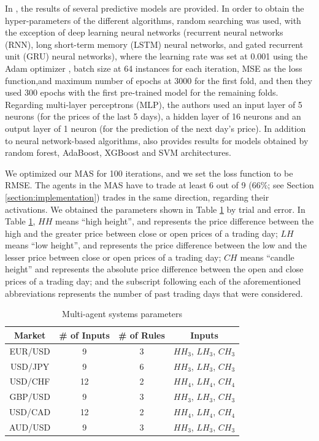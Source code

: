 \documentclass{ieeeaccess}
\begin{document}
In \cite{Munkhdalai2019}, the results of several predictive models are
provided. In order to obtain the hyper-parameters of the different
algorithms, random searching was used, with the exception of deep
learning neural networks (recurrent neural networks (RNN), long
short-term memory (LSTM) neural networks, and gated recurrent unit
(GRU) neural networks), where the learning rate was set at 0.001 using
the Adam optimizer \cite{kingma2014adam}, batch size at 64 instances
for each iteration, MSE as the loss function,and maximum number of
epochs at 3000 for the first fold, and then they used 300 epochs with
the first pre-trained model for the remaining folds. Regarding
multi-layer perceptrons (MLP), the authors used an input layer of 5 neurons
(for the prices of the last 5 days), a hidden layer of 16 neurons and
an output layer of 1 neuron (for the prediction of the next day's
price). In addition to neural network-based algorithms,
\cite{kingma2014adam} also provides results for models obtained by
random forest, AdaBoost, XGBoost and SVM
architectures.

We optimized our MAS for 100 iterations, and we set the loss
function to be RMSE. The agents in the MAS
have to trade at least 6 out of 9 (66\%; see Section
\ref{section:implementation}) trades in the same direction, regarding
their activations. We obtained the parameters shown in Table
\ref{agents-parameters} by trial and error. In Table
\ref{agents-parameters}, $HH$ means ``high height'', and represents
the price difference between the high and the greater price between
close or open prices of a trading day; $LH$ means ``low height'', and
represents the price difference between the low and the lesser price
between close or open prices of a trading day; $CH$ means ``candle
height'' and represents the absolute price difference between the open
and close prices of a trading day; and the subscript following each of
the aforementioned abbreviations represents the number of past trading
days that were considered.


\begin{table}[]
  \caption{Multi-agent systems parameters}
  \small
  \centering
  \begin{tabular}{cccc}
    \textbf{Market} & \textbf{\# of Inputs} & \textbf{\# of Rules} & \textbf{Inputs} \\
    \hline
    EUR/USD & 9 & 3 & $HH_3$, $LH_3$, $CH_3$ \\
    USD/JPY & 9 & 6 & $HH_3$, $LH_3$, $CH_3$ \\
    USD/CHF & 12 & 2 & $HH_4$, $LH_4$, $CH_4$ \\
    GBP/USD & 9 & 3 & $HH_3$, $LH_3$, $CH_3$ \\
    USD/CAD & 12 & 2 & $HH_4$, $LH_4$, $CH_4$ \\
    AUD/USD & 9 & 3 & $HH_3$, $LH_3$, $CH_3$ \\
  \end{tabular}
  \label{agents-parameters}
\end{table}
\end{document}
